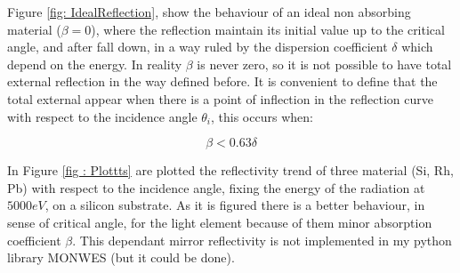 \begin{flushleft}
Figure \ref{fig: IdealReflection}, show the behaviour of an ideal non absorbing material ($\beta = 0 $), where the reflection maintain its initial value up to the critical angle, and after fall down, in a way ruled by the dispersion coefficient $\delta $ which depend on the energy. In reality $\beta $ is never zero, so it is not possible to have total external reflection in the way defined before. It is convenient to define that the total external appear when there is  a point of inflection in the reflection curve with respect to the incidence angle $\theta_i $, this occurs when:
\end{flushleft}
\begin{equation}
\beta < 0.63 \delta
\label{eq: last}
\end{equation}
\begin{flushleft}
In Figure \ref{fig : Plottts} are plotted the reflectivity trend of three material (Si, Rh, Pb) with respect to the incidence angle, fixing the energy of the radiation at $5000 eV$, on a silicon substrate. As it is figured there is a  better behaviour, in sense of critical angle, for the light element because of them minor absorption coefficient $\beta $. This dependant mirror reflectivity is not implemented in my python library MONWES (but it could be done). 
\end{flushleft}
